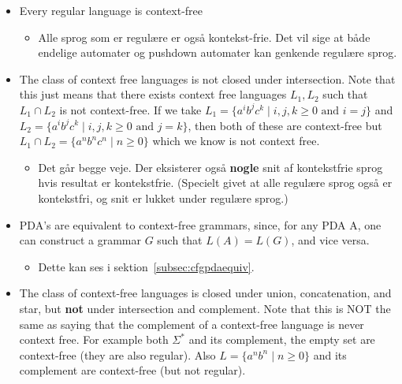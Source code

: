 \begin{itemize}
	\item Every regular language is context-free
	      \begin{itemize}
		      \item Alle sprog som er regulære er også kontekst-frie. Det vil sige at både endelige automater og pushdown automater kan genkende regulære sprog.
	      \end{itemize}

	\item The class of context free languages is not closed under intersection. Note that this just means that there exists context free languages $L_{1}, L_{2}$ such that $L_{1} \cap L_{2}$ is not context-free. If we take $L_{1} = \{a^{i}b^{j}c^{k}\;|\; i,j,k \ge 0 \text{ and } i = j\}$ and $L_{2} = \{a^{i}b^{j}c^{k}\;|\;i,j,k \ge 0 \text{ and } j = k\}$, then both of these are context-free but $L_{1} \cap L_{2} = \{a^{n}b^{n}c^{n}\; | \; n \ge 0\}$ which we know is not context free.

	      \begin{itemize}
		      \item Det går begge veje. Der eksisterer også \textbf{nogle} snit af kontekstfrie sprog hvis resultat er kontekstfrie. (Specielt givet at alle regulære sprog også er kontekstfri, og snit er lukket under regulære sprog.)
	      \end{itemize}

	\item PDA’s are equivalent to context-free grammars, since, for any PDA A, one can construct a grammar $G$ such that $L(A) = L(G)$, and vice versa.
	      \begin{itemize}
		      \item Dette kan ses i sektion~\ref{subsec:cfgpdaequiv}.
	      \end{itemize}
	\item The class of context-free languages is closed under union, concatenation, and star, but \textbf{not} under intersection and complement. Note that this is NOT the same as saying that the complement of a context-free language is never context free. For example both $\Sigma^{*}$ and its complement, the empty set are context-free (they are also regular). Also $L = \{a^{n}b^{n}\; | \; n \ge 0\}$ and its complement are context-free (but not regular).


\end{itemize}
